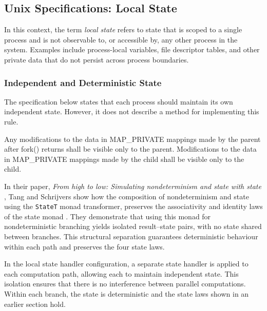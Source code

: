 \documentclass[logo,bsc,singlespacing,parskip]{infthesis}
\begin{document}
\subsection{Unix Specifications: Local State}

In this context, the term \textit{local state} refers to state that is scoped to a single process and is not observable to, or accessible by, any other process in the system. Examples include process-local variables, file descriptor tables, and other private data that do not persist across process boundaries. 


\subsubsection{Independent and Deterministic State} 

The specification below states that each process should maintain its own independent state. However, it does not describe a method for implementing this rule.

\begin{tcolorbox}[colback=gray!10, colframe=gray!60, sharp corners, boxrule=0.5pt, title={POSIX Base Specifications, Issue 7, p.899}]
    Any modifications to the data in
 MAP\_PRIVATE mappings made by the parent after fork() returns shall be visible only to
 the parent. Modifications to the data in MAP\_PRIVATE mappings made by the child shall
 be visible only to the child.
\end{tcolorbox}


In their paper, \textit{ From high to low: Simulating nondeterminism
 and state with state} \cite{tang2025high}, Tang and Schrijvers show how the composition of nondeterminism and state using the \lstinline{StateT} monad transformer, preserves the associativity and identity laws of the state monad \cite{jones1993composing}. They demonstrate that using this monad for nondeterministic branching yields isolated result–state pairs, with no state shared between branches. This structural separation guarantees deterministic behaviour within each path and preserves the four state laws.


In the local state handler configuration, a separate state handler is applied to each computation path, allowing each to maintain independent state. This isolation ensures that there is no interference between parallel computations. Within each branch, the state is deterministic and the state laws shown in an earlier section hold.
\end{document}

